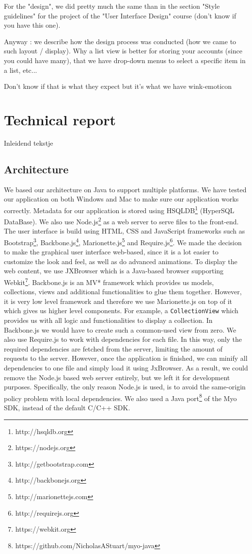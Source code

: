 \documentclass{article}
\begin{document}
For the "design", we did pretty much the same than in the section "Style guidelines" for the project of the "User Interface Design" course (don't know if you have this one). 

Anyway : we describe how the design process was conducted (how we  came to such layout / display). Why a list view is better for storing your accounts (since you could have many), that we have drop-down menus to select a specific item in a list, etc... 

Don't know if that is what they expect but it's what we have wink-emoticon

\section{Technical report}

Inleidend tekstje

\subsection{Architecture}

We based our architecture on Java to support multiple platforms. We have tested our application on both Windows and Mac to make sure our application works correctly. Metadata for our application is stored using HSQLDB\footnote{http://hsqldb.org} (HyperSQL DataBase). We also use Node.js\footnote{https://nodejs.org} as a web server to serve files to the front-end.  The user interface is build using HTML, CSS and JavaScript frameworks such as Bootstrap\footnote{http://getbootstrap.com}, Backbone.js\footnote{http://backbonejs.org}, Marionette.js\footnote{http://marionettejs.com} and Require.js\footnote{http://requirejs.org}. We made the decision to make the graphical user interface web-based, since it is a lot easier to customize the look and feel, as well as do advanced animations. To display the web content, we use JXBrowser which is a Java-based browser supporting Webkit\footnote{https://webkit.org}. Backbone.js is an MV* framework which provides us models, collections, views and additional functionalities to glue them together. However, it is very low level framework and therefore we use Marionette.js on top of it which gives us higher level components. For example, a \texttt{CollectionView} which provides us with all logic and functionalities to display a collection. In Backbone.js we would have to create such a common-used view from zero. We also use Require.js to work with dependencies for each file. In this way, only the required dependencies are fetched from the server, limiting the amount of requests to the server. However, once the application is finished, we can minify all dependencies to one file and simply load it using JxBrowser. As a result, we could remove the Node.js based web server entirely, but we left it for development purposes. Specifically, the only reason Node.js is used, is to avoid the same-origin policy problem with local dependencies. We also used a Java port\footnote{https://github.com/NicholasAStuart/myo-java} of the Myo SDK, instead of the default C/C++ SDK.
\end{document}
